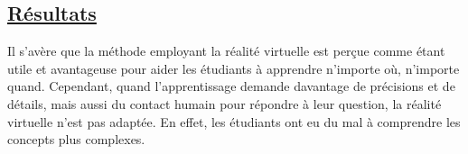 \documentclass[a4paper,10pt, oneside]{article}
\begin{document}
\subsection{\ul{Résultats}}
        \par Il s'avère que la méthode employant la réalité virtuelle est perçue comme étant utile et avantageuse pour aider les étudiants à apprendre n'importe où, n'importe quand. Cependant,
        quand l'apprentissage demande davantage de précisions et de détails, mais aussi du contact humain pour répondre à leur question, la réalité virtuelle n'est pas adaptée. En effet, les étudiants ont eu du mal à comprendre les concepts plus complexes.
\end{document}

